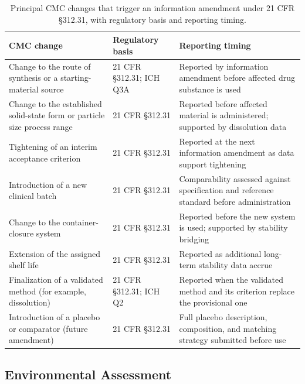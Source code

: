 \begin{table}[t]
\centering
\caption{Principal CMC changes that trigger an information amendment under 21 CFR
\S 312.31, with regulatory basis and reporting timing.}
\label{tab:cmc-change-control}
\begin{tabularx}{\textwidth}{L{4.4cm} L{3.6cm} Y}
\toprule
\textbf{CMC change} & \textbf{Regulatory basis} & \textbf{Reporting timing} \\
\midrule
Change to the route of synthesis or a starting-material source & 21 CFR \S 312.31; ICH Q3A & Reported by information amendment before affected drug substance is used \\
Change to the established solid-state form or particle size process range & 21 CFR \S 312.31 & Reported before affected material is administered; supported by dissolution data \\
Tightening of an interim acceptance criterion & 21 CFR \S 312.31 & Reported at the next information amendment as data support tightening \\
Introduction of a new clinical batch & 21 CFR \S 312.31 & Comparability assessed against specification and reference standard before administration \\
Change to the container-closure system & 21 CFR \S 312.31 & Reported before the new system is used; supported by stability bridging \\
Extension of the assigned shelf life & 21 CFR \S 312.31 & Reported as additional long-term stability data accrue \\
Finalization of a validated method (for example, dissolution) & 21 CFR \S 312.31; ICH Q2 & Reported when the validated method and its criterion replace the provisional one \\
Introduction of a placebo or comparator (future amendment) & 21 CFR \S 312.31 & Full placebo description, composition, and matching strategy submitted before use \\
\bottomrule
\end{tabularx}
\end{table}

\subsection{Environmental Assessment}

